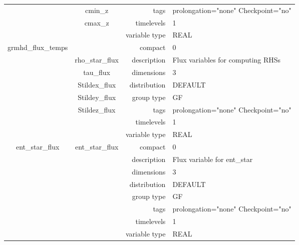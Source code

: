 \begin{tabular*}{150mm}{|c|c@{\extracolsep{\fill}}|rl|}
 & cmin\_z & tags & prolongation="none" Checkpoint="no" \\ 
 & cmax\_z & timelevels & 1 \\ 
 &  & variable type & REAL \\ 
\hline 
grmhd\_flux\_temps &  & compact & 0 \\ 
 & rho\_star\_flux & description & Flux variables for computing RHSs \\ 
 & tau\_flux & dimensions & 3 \\ 
 & Stildex\_flux & distribution & DEFAULT \\ 
 & Stildey\_flux & group type & GF \\ 
 & Stildez\_flux & tags & prolongation="none" Checkpoint="no" \\ 
 &  & timelevels & 1 \\ 
 &  & variable type & REAL \\ 
\hline 
ent\_star\_flux & ent\_star\_flux & compact & 0 \\ 
 &  & description & Flux variable for ent\_star \\ 
 &  & dimensions & 3 \\ 
 &  & distribution & DEFAULT \\ 
 &  & group type & GF \\ 
 &  & tags & prolongation="none" Checkpoint="no" \\ 
 &  & timelevels & 1 \\ 
 &  & variable type & REAL \\ 
\hline 
\end{tabular*} 



\vspace{5mm}
\vspace{5mm}

